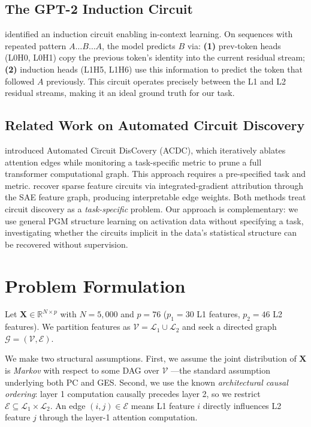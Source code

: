 \documentclass{article}
\begin{document}
\subsection{The GPT-2 Induction Circuit}

\citet{olsson2022induction} identified an induction circuit enabling
in-context learning. On sequences with repeated pattern $A \ldots B \ldots A$,
the model predicts $B$ via: \textbf{(1)} prev-token heads (L0H0, L0H1) copy
the previous token's identity into the current residual stream; \textbf{(2)}
induction heads (L1H5, L1H6) use this information to predict the token that
followed $A$ previously. This circuit operates precisely between the L1 and
L2 residual streams, making it an ideal ground truth for our task.

\subsection{Related Work on Automated Circuit Discovery}

\citet{conmy2023acdc} introduced Automated Circuit DisCovery (ACDC), which
iteratively ablates attention edges while monitoring a task-specific metric to
prune a full transformer computational graph. This approach requires a
pre-specified task and metric. \citet{marks2025sparse} recover sparse feature
circuits via integrated-gradient attribution through the SAE feature graph,
producing interpretable edge weights. Both methods treat circuit discovery as
a \emph{task-specific} problem. Our approach is complementary: we use general
PGM structure learning on activation data without specifying a task,
investigating whether the circuits implicit in the data's statistical structure
can be recovered without supervision.

\section{Problem Formulation}

Let $\mathbf{X} \in \mathbb{R}^{N \times p}$ with $N{=}5{,}000$ and $p{=}76$
($p_1{=}30$ L1 features, $p_2{=}46$ L2 features). We partition features as
$\mathcal{V} = \mathcal{L}_1 \cup \mathcal{L}_2$ and seek a directed graph
$\mathcal{G} = (\mathcal{V}, \mathcal{E})$.

We make two structural assumptions. First, we assume the joint distribution of
$\mathbf{X}$ is \emph{Markov} with respect to some DAG over $\mathcal{V}$
---the standard assumption underlying both PC and GES. Second, we use the known
\emph{architectural causal ordering}: layer 1 computation causally precedes
layer 2, so we restrict $\mathcal{E} \subseteq \mathcal{L}_1 \times
\mathcal{L}_2$. An edge $(i, j) \in \mathcal{E}$ means L1 feature $i$ directly
influences L2 feature $j$ through the layer-1 attention computation.
\end{document}
